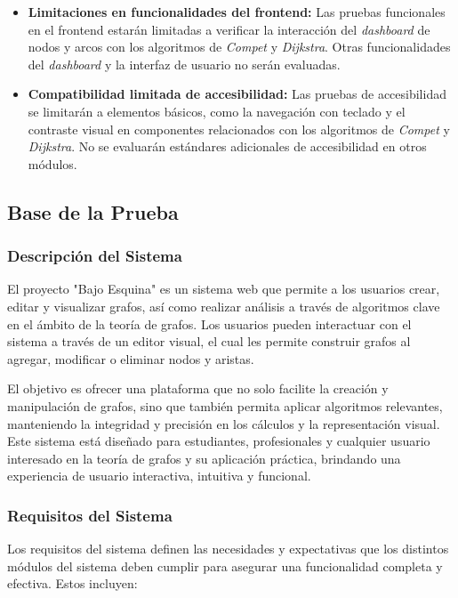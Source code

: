 \documentclass[stu, 12pt, letterpaper, donotrepeattitle, floatsintext, natbib]{apa7}
\begin{document}
\begin{itemize}
    \item \textbf{Limitaciones en funcionalidades del frontend:} Las pruebas funcionales en el frontend estarán limitadas a verificar la interacción del \textit{dashboard} de nodos y arcos con los algoritmos de \textit{Compet} y \textit{Dijkstra}. Otras funcionalidades del \textit{dashboard} y la interfaz de usuario no serán evaluadas.

    \item \textbf{Compatibilidad limitada de accesibilidad:} Las pruebas de accesibilidad se limitarán a elementos básicos, como la navegación con teclado y el contraste visual en componentes relacionados con los algoritmos de \textit{Compet} y \textit{Dijkstra}. No se evaluarán estándares adicionales de accesibilidad en otros módulos.
\end{itemize}


\subsection{Base de la Prueba}
\subsubsection{Descripción del Sistema}
El proyecto "Bajo Esquina" es un sistema web que permite a los usuarios crear, editar y visualizar grafos, así como realizar análisis a través de algoritmos clave en el ámbito de la teoría de grafos. Los usuarios pueden interactuar con el sistema a través de un editor visual, el cual les permite construir grafos al agregar, modificar o eliminar nodos y aristas.

\noindent El objetivo es ofrecer una plataforma que no solo facilite la creación y manipulación de grafos, sino que también permita aplicar algoritmos relevantes, manteniendo la integridad y precisión en los cálculos y la representación visual. Este sistema está diseñado para estudiantes, profesionales y cualquier usuario interesado en la teoría de grafos y su aplicación práctica, brindando una experiencia de usuario interactiva, intuitiva y funcional.

\subsubsection{Requisitos del Sistema}
Los requisitos del sistema definen las necesidades y expectativas que los distintos módulos del sistema deben cumplir para asegurar una funcionalidad completa y efectiva. Estos incluyen:
\end{document}
